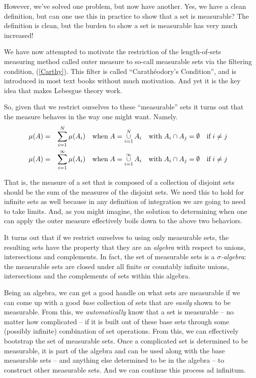 \documentclass{article}
\begin{document}
However, we've solved one problem, but now have another. Yes, we have 
a clean definition, but can one use this in practice to show that a 
set is measurable? The definition is clean, but the burden to show a set is
measurable has very much increased!

We have now attempted to motivate the restriction of the length-of-sets 
measuring method called outer measure to so-call measurable sets via 
the filtering condition, (\ref{Carthy}).
This filter is called ``Carath\'eodory's Condition'',
and is introduced in most text books without much motivation. 
And yet it is the key idea that makes Lebesgue theory work. 
 
So, given that we restrict ourselves to these ``measurable'' sets it turns out that
the measure behaves in the way one might want. Namely.
\begin{eqnarray*}
	\mu(A) & = & \sum_{i=1}^N\limits \mu(A_i) \quad \text{when} \; 
		A = \mathop{\cup}_{i=1}^N\limits A_i \quad \text{with} \;  
		A_i \cap A_j = \emptyset \quad \text{if} \; i \neq j \\
	\mu(A) & = & \sum_{i=1}^\infty\limits \mu(A_i) \quad \text{when} \; 
		A = \mathop{\cup}_{i=1}^\infty\limits A_i \quad \text{with} \; 
		A_i \cap A_j = \emptyset \quad \text{if} \; i \neq j
\end{eqnarray*}

That is, the measure of a set that is composed of a collection of disjoint 
sets should be the sum of the measures of the disjoint sets. We need this to hold
for infinite sets as well because in any definition of integration we are going 
to need to take limits.
And, as you might imagine, the solution to determining when one can apply the 
outer measure effectively boils down to the above two behaviors.

It turns out that if we restrict ourselves to using only measurable sets, 
the resulting sets have the property that they are an 
{\em algebra\/} with respect to unions, intersections and complements. 
In fact, the set of measurable sets is a {\em $\sigma$-algebra\/}:
the measurable sets are closed under all finite or countably infinite unions, 
intersections and the complements of sets within this algebra.

Being an algebra, we can get a good handle on what sets are measurable if we 
can come up with a good {\em base\/} collection of sets that are {\em easily\/} shown
to be measurable. From this, we {\em automatically\/} know that a set is measurable 
-- no matter how complicated -- if it is built out of these base sets
through some (possibly infinite) combination of set operations.
From this, we can effectively bootstrap the set of measurable sets.
Once a complicated set is determined to be measurable, it is part of the 
algebra and can be used along with the base measurable sets -- and anything 
else determined to be in the algebra -- to construct other measurable sets. 
And we can continue this process ad infinitum.
\end{document}
